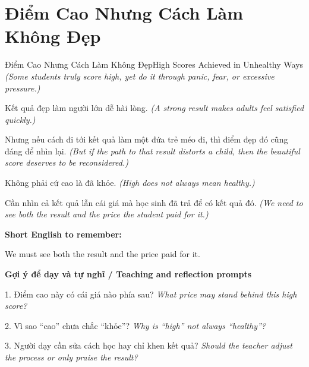 \section{Điểm Cao Nhưng Cách Làm Không Đẹp}
\begin{truyen}{Điểm Cao Nhưng Cách Làm Không Đẹp}{High Scores Achieved in Unhealthy Ways}
\textit{(Some students truly score high, yet do it through panic, fear, or excessive pressure.)}

Kết quả đẹp làm người lớn dễ hài lòng.
\textit{(A strong result makes adults feel satisfied quickly.)}

Nhưng nếu cách đi tới kết quả làm một đứa trẻ méo đi, thì điểm đẹp đó cũng đáng để nhìn lại.
\textit{(But if the path to that result distorts a child, then the beautiful score deserves to be reconsidered.)}

Không phải cứ cao là đã khỏe.
\textit{(High does not always mean healthy.)}

\end{truyen}

\begin{baihoc}
Cần nhìn cả kết quả lẫn cái giá mà học sinh đã trả để có kết quả đó.
\textit{(We need to see both the result and the price the student paid for it.)}
\end{baihoc}

\begin{ghinhoanh}
\textbf{Short English to remember:}

We must see both the result and the price paid for it.

\end{ghinhoanh}

\begin{tuhocnhanh}
\textbf{Gợi ý để dạy và tự nghĩ / Teaching and reflection prompts}

1. Điểm cao này có cái giá nào phía sau? \textit{What price may stand behind this high score?}

2. Vì sao “cao” chưa chắc “khỏe”? \textit{Why is “high” not always “healthy”?}

3. Người dạy cần sửa cách học hay chỉ khen kết quả? \textit{Should the teacher adjust the process or only praise the result?}
\end{tuhocnhanh}
\ngancach

